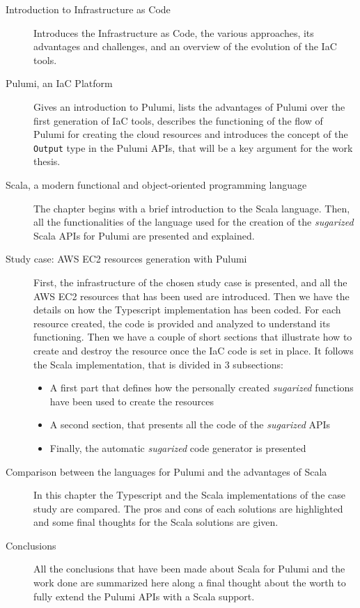 \begin{description}
  \item[Introduction to Infrastructure as Code] Introduces the Infrastructure as Code, the various approaches, its advantages and challenges, and an overview of the evolution of the IaC tools.
  \item[Pulumi, an IaC Platform] Gives an introduction to Pulumi, lists the advantages of Pulumi over the first generation of IaC tools, describes the functioning of the flow of Pulumi for creating the cloud resources and introduces the concept of the \texttt{Output} type in the Pulumi APIs, that will be a key argument for the work thesis.
  \item[Scala, a modern functional and object-oriented programming language] The chapter begins with a brief introduction to the Scala language. Then, all the functionalities of the language used for the creation of the \textit{sugarized} Scala APIs for Pulumi are presented and explained.
  \item[Study case: AWS EC2 resources generation with Pulumi] First, the infrastructure of the chosen study case is presented, and all the AWS EC2 resources that has been used are introduced. Then we have the details on how the Typescript implementation has been coded. For each resource created, the code is provided and analyzed to understand its functioning. Then we have a couple of short sections that illustrate how to create and destroy the resource once the IaC code is set in place. It follows the Scala implementation, that is divided in 3 subsections:
        \begin{itemize}
          \item A first part that defines how the personally created \textit{sugarized} functions have been used to create the resources
          \item A second section, that presents all the code of the \textit{sugarized} APIs
          \item Finally, the automatic \textit{sugarized} code generator is presented
        \end{itemize}
  \item[Comparison between the languages for Pulumi and the advantages of Scala] In this chapter the Typescript and the Scala implementations of the case study are compared. The pros and cons of each solutions are highlighted and some final thoughts for the Scala solutions are given.
  \item[Conclusions] All the conclusions that have been made about Scala for Pulumi and the work done are summarized here along a final thought about the worth to fully extend the Pulumi APIs with a Scala support.
\end{description}